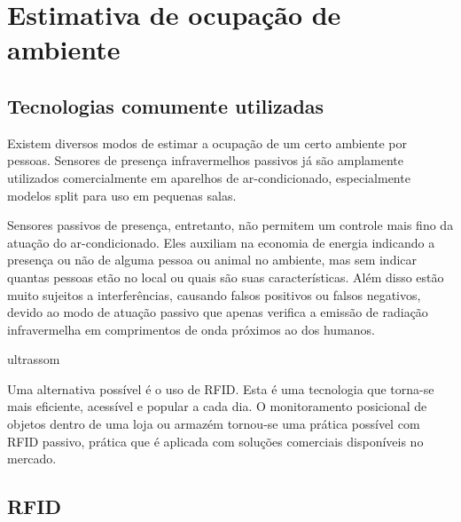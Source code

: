 
\chapter{Estimativa de ocupação de ambiente\label{chap:EstOcpAmb}}


\section{Tecnologias comumente utilizadas}
 
 Existem diversos modos de estimar a ocupação de um certo ambiente por pessoas. Sensores de presença infravermelhos passivos já são amplamente utilizados comercialmente em aparelhos de ar-condicionado, especialmente modelos split para uso em pequenas salas.
 
 Sensores passivos de presença, entretanto, não permitem um controle mais fino da atuação do ar-condicionado. Eles auxiliam na economia de energia indicando a presença ou não de alguma pessoa ou animal no ambiente, mas sem indicar quantas pessoas etão no local ou quais são suas características. Além disso estão muito sujeitos a interferências, causando falsos positivos ou falsos negativos, devido ao modo de atuação passivo que apenas verifica a emissão de radiação infravermelha em comprimentos de onda próximos ao dos humanos.
 
 
 
 ultrassom


 Uma alternativa possível é o uso de RFID. Esta é uma tecnologia que torna-se mais eficiente, acessível e popular a cada dia. O monitoramento posicional de objetos dentro de uma loja ou armazém tornou-se uma prática possível com RFID passivo, prática que é aplicada com soluções comerciais disponíveis no mercado.
 
\section{RFID}

